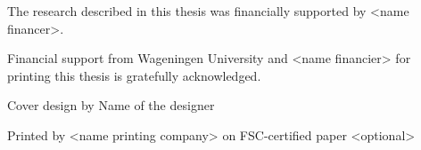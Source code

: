 \vspace*{1cm}
The research described in this thesis was financially supported by <name financer>.

Financial support from Wageningen University and <name financier> for printing this
thesis is gratefully acknowledged.


\vspace*{\fill}
Cover design by Name of the designer

Printed by <name printing company> on FSC-certified paper <optional>
